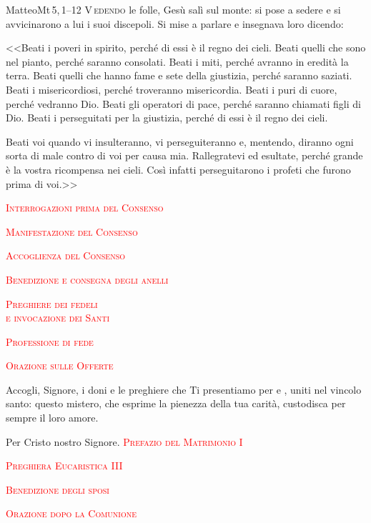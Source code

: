 \documentclass[11pt]{book}
\renewcommand{\intestfont}[1]{{\Large\scshape\textcolor{red}{#1}}}
\newcommand{\sottomomento}[1]{{\intestfont{#1}}\par\medskip}
\begin{document}
\begin{vangelo}{Matteo}{Mt\,5,\,1--12}
\lettrine[nindent=-1pt,slope=-0.4em,lines=3]{V}{\,edendo} le folle, Gesù salì sul monte: si pose a sedere e si avvicinarono a lui i suoi discepoli. Si mise a parlare e insegnava loro dicendo:

<<Beati i poveri in spirito, perché di essi è il regno dei cieli.
Beati quelli che sono nel pianto, perché saranno consolati.
Beati i miti, perché avranno in eredità la terra.
Beati quelli che hanno fame e sete della giustizia, perché saranno saziati.
Beati i misericordiosi, perché troveranno misericordia.
Beati i puri di cuore, perché vedranno Dio.
Beati gli operatori di pace, perché saranno chiamati figli di Dio.
Beati i perseguitati per la giustizia, perché di essi è il regno dei cieli.

Beati voi quando vi insulteranno, vi perseguiteranno e, mentendo, diranno ogni sorta di male contro di voi per causa mia. Rallegratevi ed esultate, perché grande è la vostra ricompensa nei cieli. Così infatti perseguitarono i profeti che furono prima di voi.>>
\end{vangelo}
\newpage%
\sottomomento{Interrogazioni prima del Consenso}
\matrintro
\medskip

\matrpre
\medskip
\newpage%
\sottomomento{Manifestazione del Consenso}
\consintro
\medskip

\promesse
\medskip

\sottomomento{Accoglienza del Consenso}
\preghpost

\newpage%
\sottomomento{Benedizione e consegna degli anelli}
\benedizioneanelli

\medskip

\consegnanello


\newpage%
\sottomomento{Preghiere dei fedeli\\ e invocazione dei Santi}
\introfedeli
\preghierefedeli
\pagebreak

\introlitanie

\litanie
\newpage%
\sottomomento{Professione di fede}
\credo
\newpage%
\sottomomento{Orazione sulle Offerte}
Accogli, Signore, i doni e le preghiere che Ti presentiamo
per \sposa{} e \sposo, uniti nel vincolo
santo: questo mistero, che esprime la pienezza della
tua carità, custodisca per sempre il loro amore. \par\nobreak
Per Cristo nostro Signore.
\newpage%
\sottomomento{Prefazio del Matrimonio I}
\prefazio

\medskip
{\bfseries\santosanto}
\newpage%
\sottomomento{Preghiera Eucaristica III}
\pregheucar
\misterofede
\orazionieucar
\sottomomento{Benedizione degli sposi}
\benedizionesposi[1]


\sottomomento{Orazione dopo la Comunione}
\preghierecomunione
\newpage%
\articolilegge
\newpage%
\benedizionefinale
\congedo
\end{document}
